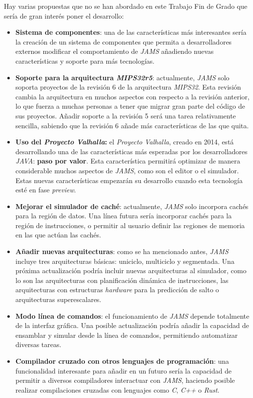 Hay varias propuestas que no se han abordado en este Trabajo
Fin de Grado que sería de gran interés poner el desarrollo:
\begin{itemize}
    \item \textbf{Sistema de componentes}: una de las características
    más interesantes sería la creación de un sistema de componentes
    que permita a desarrolladores externos modificar el comportamiento
    de \textit{JAMS} añadiendo nuevas características y soporte para
    más tecnologías.
    \item \textbf{Soporte para la arquitectura \textit{MIPS32r5}}:
    actualmente, \textit{JAMS} solo soporta proyectos de la revisión 6
    de la arquitectura \textit{MIPS32}.
    Esta revisión cambia la arquitectura en muchos aspectos con respecto
    a la revisión anterior, lo que fuerza a muchas personas a tener
    que migrar gran parte del código de sus proyectos.
    Añadir soporte a la revisión 5 será una tarea relativamente sencilla,
    sabiendo que la revisión 6 añade más características de las que quita.
    \item \textbf{Uso del \textit{Proyecto Valhalla}:} el
    \textit{Proyecto Valhalla}\cite{PROJECT_VALHALLA}, creado en 2014,
    está desarrollando una de las características más esperadas
    por los desarrolladores \textit{JAVA}: \textbf{paso por valor}.
    Esta característica permitirá optimizar de manera considerable
    muchos aspectos de \textit{JAMS}, como son el editor o el simulador.
    Estas nuevas características empezarán su desarrollo cuando esta
    tecnología esté en fase \textit{preview}.
    \item \textbf{Mejorar el simulador de caché}: actualmente,
    \textit{JAMS} solo incorpora cachés para la región de datos.
    Una línea futura sería incorporar cachés para la región
    de instrucciones, o permitir al usuario definir las regiones
    de memoria en las que actúan las cachés.
    \item \textbf{Añadir nuevas arquitecturas}: como se ha mencionado
    antes, \textit{JAMS} incluye tres arquitecturas básicas: uniciclo,
    multiciclo y segmentada.
    Una próxima actualización podría incluir nuevas arquitecturas al
    simulador, como lo son las arquitecturas con planificación dinámica de instrucciones,
    las arquitecturas con estructuras \textit{hardware} para la predicción de salto
    o arquitecturas superescalares.
    \item \textbf{Modo línea de comandos}: el funcionamiento de \textit{JAMS}
    depende totalmente de la interfaz gráfica.
    Una posible actualización podría añadir la capacidad de
    ensamblar y simular desde la línea de comandos, permitiendo
    automatizar diversas tareas.
    \item \textbf{Compilador cruzado con otros lenguajes de programación}:
    una funcionalidad interesante para añadir en un futuro sería la
    capacidad de permitir a diversos compiladores interactuar con
    \textit{JAMS}, haciendo posible realizar compilaciones cruzadas
    con lenguajes como \textit{C}, \textit{C++} o \textit{Rust}.
\end{itemize}


